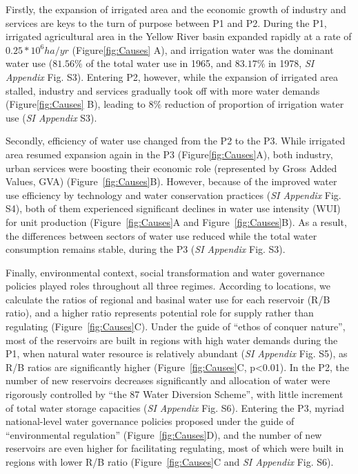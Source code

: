 \documentclass[9pt, twocolumn, twoside, lineno]{pnas-new}
\begin{document}
Firstly, the expansion of irrigated area and the economic growth of industry and services are keys to the turn of purpose between P1 and P2. During the P1, irrigated agricultural area in the Yellow River basin expanded rapidly at a rate of $0.25*10^6 ha/yr$ (Figure\ref{fig:Causes} A), and irrigation water was the dominant water use ($81.56\%$ of the total water use in 1965, and $83.17\%$ in 1978, \textit{SI Appendix} Fig. S3). Entering P2, however, while the expansion of irrigated area stalled, industry and services gradually took off with more water demands (Figure\ref{fig:Causes} B), leading to $8\%$ reduction of proportion of irrigation water use (\textit{SI Appendix} S3).

Secondly, efficiency of water use changed from the P2 to the P3.
While irrigated area resumed expansion again in the P3 (Figure\ref{fig:Causes}A), both industry, urban services were boosting their economic role (represented by Gross Added Values, GVA) (Figure~\ref{fig:Causes}B). 
However, because of the improved water use efficiency by technology and water conservation practices (\textit{SI Appendix} Fig. S4), both of them experienced significant declines in water use intensity (WUI) for unit production (Figure~\ref{fig:Causes}A and Figure~\ref{fig:Causes}B). 
As a result, the differences between sectors of water use reduced while the total water consumption remains stable, during the P3 (\textit{SI Appendix} Fig. S3).

Finally, environmental context, social transformation and water governance policies played roles throughout all three regimes. 
According to locations, we calculate the ratios of regional and basinal water use for each reservoir (R/B ratio), and a higher ratio represents potential role for supply rather than regulating (Figure~\ref{fig:Causes}C).
Under the guide of ``ethos of conquer nature'', most of the reservoirs are built in regions with high water demands during the P1, when natural water resource is relatively abundant (\textit{SI Appendix} Fig. S5), as R/B ratios are significantly higher (Figure~\ref{fig:Causes}C, p<0.01). 
In the P2, the number of new reservoirs decreases significantly and allocation of water were rigorously controlled by ``the 87 Water Diversion Scheme'', with little increment of total water storage capacities (\textit{SI Appendix} Fig. S6). 
Entering the P3, myriad national-level water governance policies proposed under the guide of ``environmental regulation'' (Figure~\ref{fig:Causes}D), and the number of new reservoirs are even higher for facilitating regulating, most of which were built in regions with lower R/B ratio (Figure~\ref{fig:Causes}C and \textit{SI Appendix} Fig. S6).
\end{document}
